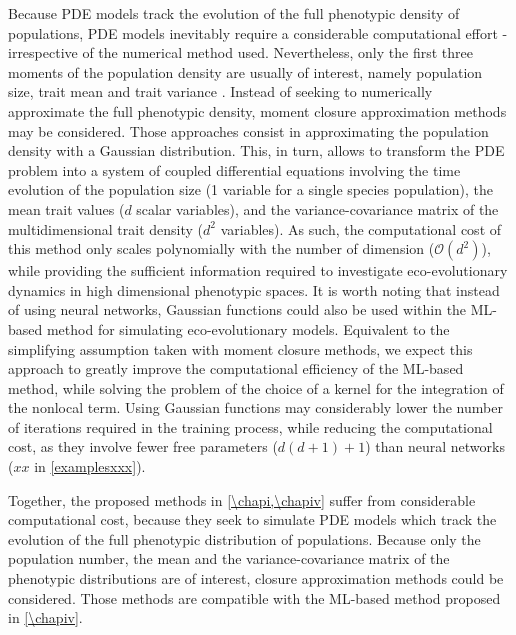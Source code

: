 Because PDE models track the evolution of the full phenotypic density of populations, PDE models inevitably require a considerable computational effort - irrespective of the numerical method used. 
% 
Nevertheless, only the first three moments of the population density are usually of interest, namely population size, trait mean and trait variance \citep{Nordbotten2020}. 
% 
Instead of seeking to numerically approximate the full phenotypic density, moment closure approximation methods \citep{Wickman2021,Lion2022,Nordbotten2020} may be considered. Those approaches consist in approximating the population density with a Gaussian distribution. This, in turn, allows to transform the PDE problem into a system of coupled differential equations involving the time evolution of the population size (1 variable for a single species population), the mean trait values ($d$ scalar variables), and the variance-covariance matrix of the multidimensional trait density ($d^2$ variables). As such, the computational cost of this method only scales polynomially with the number of dimension ($\mathcal{O}(d^2)$), while providing the sufficient information required to investigate eco-evolutionary dynamics in high dimensional phenotypic spaces. 
% 
It is worth noting that instead of using neural networks, Gaussian functions could also be used within the ML-based method for simulating eco-evolutionary models. Equivalent to the simplifying assumption taken with moment closure methods, we expect this approach to greatly improve the computational efficiency of the ML-based method, while solving the problem of the choice of a kernel for the integration of the nonlocal term. Using Gaussian functions may considerably lower the number of iterations required in the training process, while reducing the computational cost, as they involve fewer free parameters ($d(d+1) + 1$) than neural networks ($xx$ in \cref{examplesxxx}).

Together, the proposed methods in \cref{\chapi,\chapiv} suffer from considerable computational cost, because they seek to simulate PDE models which track the evolution of the full phenotypic distribution of populations. Because only the population number, the mean and the variance-covariance matrix of the phenotypic distributions are of interest, closure approximation methods could be considered. Those methods are compatible with the ML-based method proposed in \cref{\chapiv}.


